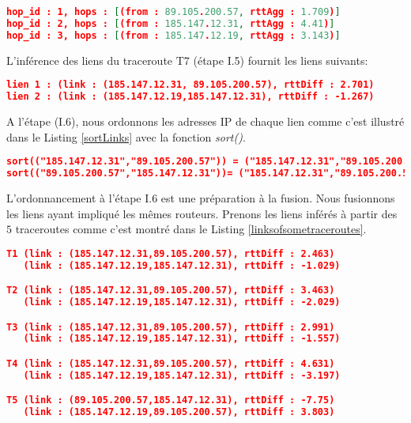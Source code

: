 \begin{lstlisting}[language=json,firstnumber=1, caption={Les sauts du traceroute T7 (après l'agrégation)}, basicstyle=\footnotesize, label=aftermedianagg]
hop_id : 1, hops : [(from : 89.105.200.57, rttAgg : 1.709)]
hop_id : 2, hops : [(from : 185.147.12.31, rttAgg : 4.41)] 
hop_id : 3, hops : [(from : 185.147.12.19, rttAgg : 3.143)]
\end{lstlisting}

L'inférence  des liens du traceroute T7 (étape I.5) fournit les liens suivants: 

\begin{lstlisting}[language=json,firstnumber=1, caption={Exemple des liens inférés du traceroute T7}, basicstyle = \footnotesize]
lien 1 : (link : (185.147.12.31, 89.105.200.57), rttDiff : 2.701)
lien 2 : (link : (185.147.12.19,185.147.12.31), rttDiff : -1.267)
\end{lstlisting}


A l'étape (I.6), nous ordonnons les adresses IP de chaque lien  comme c'est illustré dans le Listing \ref{sortLinks} avec la fonction \textit{sort()}. 

\begin{lstlisting}[language=json,firstnumber=1, caption={Illustration de l'ordre des liens}, basicstyle = \footnotesize, label=sortLinks]
sort(("185.147.12.31","89.105.200.57")) = ("185.147.12.31","89.105.200.57")
sort(("89.105.200.57","185.147.12.31"))= ("185.147.12.31","89.105.200.57")   
\end{lstlisting}

L'ordonnancement à l'étape  I.6 est une préparation à la fusion. Nous fusionnons les liens ayant impliqué les mêmes routeurs. Prenons les liens inférés à partir des $5$ traceroutes  comme c'est montré dans le Listing \ref{linksofsometraceroutes}.

\begin{lstlisting}[language=json,firstnumber=1, caption={Liste des liens possibles inférés via  les traceroutes T1, T2, T3, T4 et T5}, basicstyle = \footnotesize, label=linksofsometraceroutes]
T1 (link : (185.147.12.31,89.105.200.57), rttDiff : 2.463)
   (link : (185.147.12.19,185.147.12.31), rttDiff : -1.029)

T2 (link : (185.147.12.31,89.105.200.57), rttDiff : 3.463) 
   (link : (185.147.12.19,185.147.12.31), rttDiff : -2.029)

T3 (link : (185.147.12.31,89.105.200.57), rttDiff : 2.991) 
   (link : (185.147.12.19,185.147.12.31), rttDiff : -1.557)

T4 (link : (185.147.12.31,89.105.200.57), rttDiff : 4.631) 
   (link : (185.147.12.19,185.147.12.31), rttDiff : -3.197)

T5 (link : (89.105.200.57,185.147.12.31), rttDiff : -7.75) 
   (link : (185.147.12.19,89.105.200.57), rttDiff : 3.803)
\end{lstlisting}

